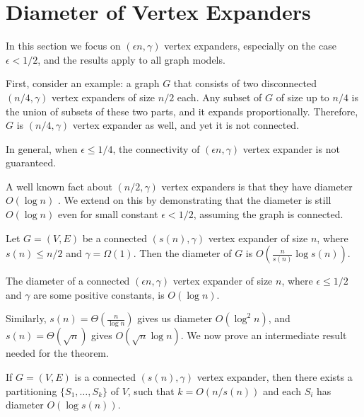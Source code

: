 \section{Diameter of Vertex Expanders}

In this section we focus on $(\epsilon n,\gamma)$ vertex expanders,
especially on the case $\epsilon<1/2$, and the results apply to all graph models.

First, consider an example: a graph $G$ that consists of two disconnected
$(n/4,\gamma)$ vertex expanders of size $n/2$ each.
Any subset of $G$ of size up to $n/4$ is the union of subsets of these two parts,
and it expands proportionally.
Therefore, $G$ is $(n/4,\gamma)$ vertex expander as well,
and yet it is not connected.

In general, when $\epsilon\leq1/4$, the connectivity of
$(\epsilon n,\gamma)$ vertex expander is not guaranteed.

A well known fact about $(n/2,\gamma)$ vertex expanders is that
they have diameter $O(\log n)$ \cite{rao12,hlw06}.
We extend on this by demonstrating that the diameter is still $O(\log n)$
even for small constant $\epsilon<1/2$, assuming the graph is connected.

\begin{theorem}
    \label{thm:vertex-expander-diameter}
    Let $G=(V,E)$ be a connected $(s(n),\gamma)$ vertex expander of size $n$,
    where $s(n)\leq n/2$ and $\gamma=\Omega(1)$.
    Then the diameter of $G$ is $O\left(\frac{n}{s(n)}\log s(n)\right)$.
\end{theorem}

\begin{corollary}
    The diameter of a connected $(\epsilon n,\gamma)$ vertex expander of size $n$,
    where $\epsilon\leq1/2$ and $\gamma$ are some positive constants, is $O(\log n)$.
\end{corollary}

Similarly, $s(n)=\Theta\left(\frac{n}{\log n}\right)$ gives us
diameter $O\left(\log^2n\right)$,
and $s(n)=\Theta(\sqrt{n})$ gives $O\left(\sqrt{n}\log n\right)$.
We now prove an intermediate result needed for the theorem.

\begin{lemma}
    \label{lem:vertex-expander-partitioning}
    If $G=(V,E)$ is a connected $(s(n),\gamma)$ vertex expander,
    then there exists a partitioning $\{S_1,\ldots,S_k\}$ of $V$,
    such that $k=O(n/s(n))$ and each $S_i$ has diameter $O(\log s(n))$.
\end{lemma}

